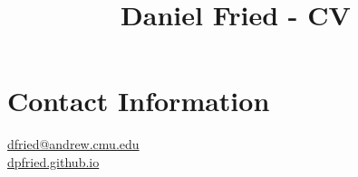 \documentclass[11pt]{article}
\newcommand{\mailto}[1]{
  \href{mailto:#1}{#1}
}
\begin{document}
\title{Daniel Fried - CV}

\section{Contact Information}
\mailto{dfried@andrew.cmu.edu} \\
{\small \url{dpfried.github.io}}






\end{document}
